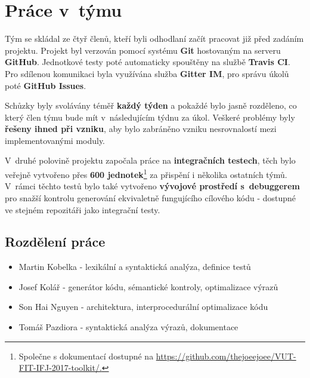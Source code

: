 \section{Práce v~týmu}
Tým se skládal ze čtyř členů, kteří byli odhodlaní začít
pracovat již před zadáním projektu. Projekt byl verzován pomocí systému \textbf{Git} hostovaným na serveru \textbf{GitHub}. Jednotkové testy poté automaticky spouštěny na službě \textbf{Travis CI}. Pro sdílenou komunikaci byla využívána služba \textbf{Gitter IM}, pro správu úkolů poté \textbf{GitHub Issues}.

Schůzky byly svolávány téměř \textbf{každý týden} a pokaždé bylo jasně rozděleno, co který člen týmu bude mít v~následujícím týdnu za úkol. Veškeré problémy byly \textbf{řešeny ihned při vzniku}, aby bylo zabráněno vzniku nesrovnalostí mezi implementovanými moduly.

V~druhé polovině projektu započala práce na \textbf{integračních testech}, těch bylo veřejně vytvořeno přes \textbf{600 jednotek}\footnote{Společne s dokumentací dostupné na \href{https://github.com/thejoeejoee/VUT-FIT-IFJ-2017-toolkit/}{https://github.com/thejoeejoee/VUT-FIT-IFJ-2017-toolkit/.}} za přispění i několika ostatních týmů. V~rámci těchto testů bylo také vytvořeno \textbf{vývojové prostředí s~debuggerem} pro snažší kontrolu generování ekvivaletně fungujícího cílového kódu - dostupné ve stejném repozitáři jako integrační testy.

\subsection{Rozdělení práce}
\begin{itemize}
    \item Martin Kobelka - lexikální a syntaktická analýza, definice testů
    \item Josef Kolář - generátor kódu, sémantické kontroly, optimalizace výrazů
    \item Son Hai Nguyen - architektura, interprocedurální optimalizace kódu
    \item Tomáš Pazdiora - syntaktická analýza výrazů, dokumentace
\end{itemize}
